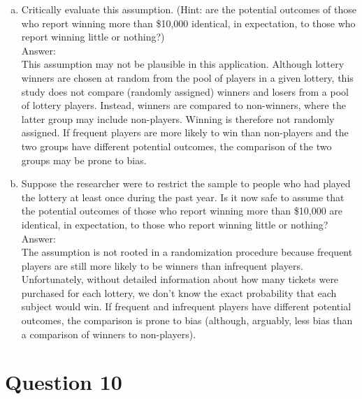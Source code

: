 \documentclass[11pt,notitlepage]{article}\usepackage[]{graphicx}\usepackage[]{color}
\makeatletter
\newenvironment{kframe}{%
 \def\at@end@of@kframe{}%
 \ifinner\ifhmode%
  \def\at@end@of@kframe{\end{minipage}}%
  \begin{minipage}{\columnwidth}%
 \fi\fi%
 \def\FrameCommand##1{\hskip\@totalleftmargin \hskip-\fboxsep
 \colorbox{shadecolor}{##1}\hskip-\fboxsep
     \hskip-\linewidth \hskip-\@totalleftmargin \hskip\columnwidth}%
 \MakeFramed {\advance\hsize-\width
   \@totalleftmargin\z@ \linewidth\hsize
   \@setminipage}}%
 {\par\unskip\endMakeFramed%
 \at@end@of@kframe}
\newenvironment{knitrout}{}{} %
\makeatother
\begin{document}
\begin{enumerate}[a)]
\item Critically evaluate this assumption. (Hint: are the potential outcomes of those who report winning more than \$10,000 identical, in expectation, to those who report winning little or nothing?)  \\
Answer:\\
This assumption may not be plausible in this application.  Although lottery winners are chosen at random from the pool of players in a given lottery, this study does not compare (randomly assigned) winners and losers from a pool of lottery players.  Instead, winners are compared to non-winners, where the latter group may include non-players.  Winning is therefore not randomly assigned.  If frequent players are more likely to win than non-players and the two groups have different potential outcomes, the comparison of the two groups may be prone to bias.
\item Suppose the researcher were to restrict the sample to people who had played the lottery at least once during the past year.  Is it now safe to assume that the potential outcomes of those who report winning more than \$10,000 are identical, in expectation, to those who report winning little or nothing?  \\
Answer:\\
The assumption is not rooted in a randomization procedure because frequent players are still more likely to be winners than infrequent players.  Unfortunately, without detailed information about how many tickets were purchased for each lottery, we don't know the exact probability that each subject would win.  If frequent and infrequent players have different potential outcomes, the comparison is prone to bias (although, arguably, less bias than a comparison of winners to non-players).

\end{enumerate}



\section*{Question 10}
\begin{knitrout}
\color{fgcolor}\begin{kframe}
\begin{verbatim}





\end{verbatim}
\end{kframe}
\end{knitrout}
\end{document}
